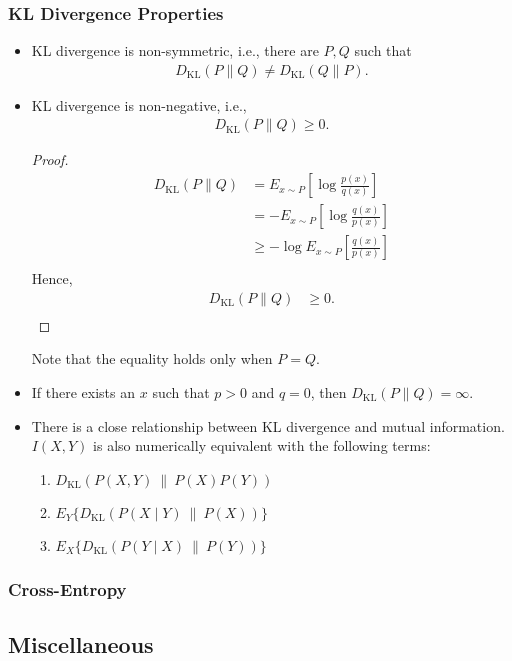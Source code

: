 \documentclass[a4paper,12pt]{article}
\theoremstyle{definition}
\begin{document}
\subsubsection*{KL Divergence Properties}
\begin{itemize}
    \item KL divergence is non-symmetric, i.e., there are $P, Q$ such that
    \begin{align*}
        D_{\mathrm{KL}}(P\|Q) \neq D_{\mathrm{KL}}(Q\|P).
    \end{align*}
    \item KL divergence is non-negative, i.e.,
    \begin{align*}
        D_{\mathrm{KL}}(P\|Q) \geq 0.
    \end{align*}
    \begin{proof}
        \begin{align*}
            D_{\mathrm{KL}}(P\|Q) &= E_{x \sim P} \left[ \log \frac{p(x)}{q(x)} \right] \\
                                  &= -E_{x \sim P} \left[ \log \frac{q(x)}{p(x)} \right] \\
                                  &\geq -\log E_{x \sim P} \left[ \frac{q(x)}{p(x)} \right] \\
        \end{align*}
        Hence,
        \begin{align*}
            D_{\mathrm{KL}}(P\|Q) &\geq 0. \\
        \end{align*}
    \end{proof}
    Note that the equality holds only when $P = Q$.
    \item If there exists an $x$ such that $p > 0$ and $q = 0$, 
    then $D_{\mathrm{KL}}(P\|Q) = \infty$.
    \item There is a close relationship between KL divergence and mutual information. 
    $I(X,Y)$ is also numerically equivalent with the following terms:
    \begin{enumerate}
        \item $D_{\mathrm{KL}}(P(X, Y) \ \| \ P(X)P(Y))$
        \item $E_Y \{ D_{\mathrm{KL}}(P(X \mid Y) \ \| \ P(X)) \}$
        \item $E_X \{ D_{\mathrm{KL}}(P(Y \mid X) \ \| \ P(Y)) \}$
    \end{enumerate}
\end{itemize}

\subsubsection*{Cross-Entropy}




\newpage
\subsection*{Miscellaneous}
\end{document}
